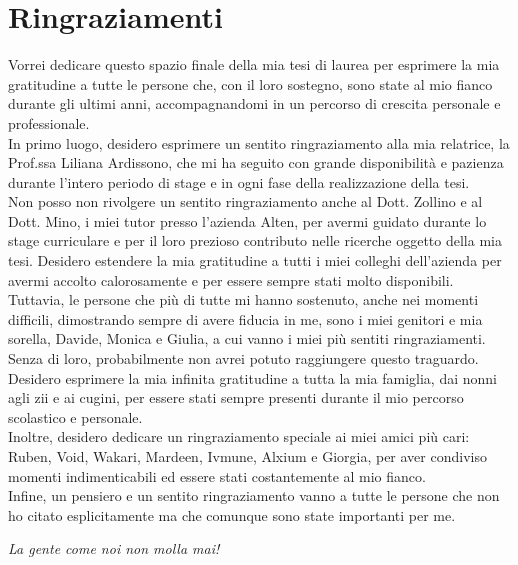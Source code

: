 \chapter*{Ringraziamenti}
\label{chap:Ringraziamenti}

{\myfontsize 

    Vorrei dedicare questo spazio finale della mia tesi di laurea per esprimere la mia gratitudine a tutte le persone che, con il loro sostegno, sono state al mio fianco durante gli ultimi anni, accompagnandomi in un percorso di crescita personale e professionale.\\
    In primo luogo, desidero esprimere un sentito ringraziamento alla mia relatrice, la Prof.ssa Liliana Ardissono, che mi ha seguito con grande disponibilità e pazienza durante l'intero periodo di stage e in ogni fase della realizzazione della tesi.\\
    Non posso non rivolgere un sentito ringraziamento anche al Dott. Zollino e al Dott. Mino, i miei tutor presso l'azienda Alten, per avermi guidato durante lo stage curriculare e per il loro prezioso contributo nelle ricerche oggetto della mia tesi. Desidero estendere la mia gratitudine a tutti i miei colleghi dell'azienda per avermi accolto calorosamente e per essere sempre stati molto disponibili.\\
    Tuttavia, le persone che più di tutte mi hanno sostenuto, anche nei momenti difficili, dimostrando sempre di avere fiducia in me, sono i miei genitori e mia sorella, Davide, Monica e Giulia, a cui vanno i miei più sentiti ringraziamenti. Senza di loro, probabilmente non avrei potuto raggiungere questo traguardo. Desidero esprimere la mia infinita gratitudine a tutta la mia famiglia, dai nonni agli zii e ai cugini, per essere stati sempre presenti durante il mio percorso scolastico e personale.\\
    Inoltre, desidero dedicare un ringraziamento speciale ai miei amici più cari: Ruben, Void, Wakari, Mardeen, Ivmune, Alxium e Giorgia, per aver condiviso momenti indimenticabili ed essere stati costantemente al mio fianco.\\
    Infine, un pensiero e un sentito ringraziamento vanno a tutte le persone che non ho citato esplicitamente ma che comunque sono state importanti per me.
    \begin{center}
        \textit{La gente come noi non molla mai!}
    \end{center}

}